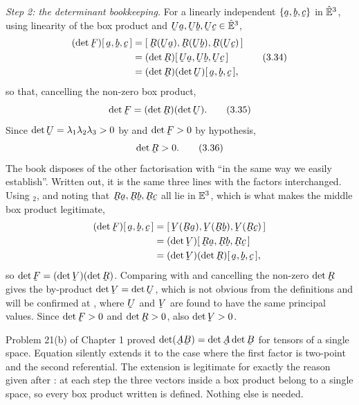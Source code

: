 \smallskip
\noindent
\emph{Step 2: the determinant bookkeeping.} For a linearly independent
$\{\ba,\bb,\bc\}$ in $\hat{\mathbb{E}}^{3}$, using linearity of the box product and
$\bU\ba,\bU\bb,\bU\bc\in\hVt$,
\begin{equation}
\begin{aligned}
   (\det\bF)\tbox\ba\bb\bc
   &=\tbox{\bR(\bU\ba)}{\bR(\bU\bb)}{\bR(\bU\bc)}\\
   &=(\det\bR)\tbox{\bU\ba}{\bU\bb}{\bU\bc}\\
   &=(\det\bR)(\det\bU)\tbox\ba\bb\bc,
\end{aligned}
   \tag{3.34}\label{eq:3.34}
\end{equation}
so that, cancelling the non-zero box product,
\begin{equation}
   \det\bF=(\det\bR)(\det\bU).
   \tag{3.35}\label{eq:3.35}
\end{equation}
Since $\det\bU=\lambda_{1}\lambda_{2}\lambda_{3}>0$ by  and
$\det\bF>0$ by hypothesis,
\begin{equation}
   \det\bR>0 .
   \tag{3.36}\label{eq:3.36}
\end{equation}
The book disposes of the other factorisation with ``in the same way we
easily establish''. Written out, it is the same three lines with the
factors interchanged. Using $_{2}$, and noting that
$\bR\ba,\bR\bb,\bR\bc$ all lie in $\mathbb{E}^{3}$, which is what makes the middle
box product legitimate,
\[
\begin{aligned}
   (\det\bF)\tbox\ba\bb\bc
   &=\tbox{\bV(\bR\ba)}{\bV(\bR\bb)}{\bV(\bR\bc)}\\
   &=(\det\bV)\tbox{\bR\ba}{\bR\bb}{\bR\bc}\\
   &=(\det\bV)(\det\bR)\tbox\ba\bb\bc ,
\end{aligned}
\]
so $\det\bF=(\det\bV)(\det\bR)$. Comparing with  and cancelling
the non-zero $\det\bR$ gives the by-product $\det\bV=\det\bU$, which is
not obvious from the definitions and will be confirmed at , where
$\bU$ and $\bV$ are found to have the same principal values. Since
$\det\bF>0$ and $\det\bR>0$, also $\det\bV>0$.

\begin{remark}\label{rem:detext}
Problem 21(b) of Chapter 1 proved $\det(\bA\bB)=\det\bA\det\bB$ for
tensors of a single space. Equation  silently extends it to the
case where the first factor is two-point and the second referential. The
extension is legitimate for exactly the reason given after : at
each step the three vectors inside a box product belong to a single space,
so every box product written is defined. Nothing else is needed.
\end{remark}

